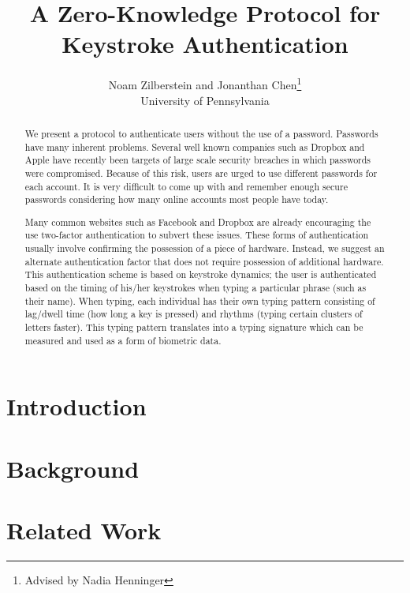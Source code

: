\documentclass[11pt]{article}
\begin{document}
\nocite{*}

\title{A Zero-Knowledge Protocol for Keystroke Authentication}

\author{Noam Zilberstein and Jonanthan Chen\thanks{Advised by Nadia Henninger} \\
University of Pennsylvania
}

\maketitle

\begin{abstract}
  We present a protocol to authenticate users without the use of a password. Passwords have many inherent problems. Several well known companies such as Dropbox and Apple have recently been targets of large scale security breaches in which passwords were compromised. Because of this risk, users are urged to use different passwords for each account. It is very difficult to come up with and remember enough secure passwords considering how many online accounts most people have today.

Many common websites such as Facebook and Dropbox are already encouraging the use two-factor authentication to subvert these issues. These forms of authentication usually involve confirming the possession of a piece of hardware. Instead, we suggest an alternate authentication factor that does not require possession of additional hardware. This authentication scheme is based on keystroke dynamics; the user is authenticated based on the timing of his/her keystrokes when typing a particular phrase (such as their name). When typing, each individual has their own typing pattern consisting of lag/dwell time (how long a key is pressed) and rhythms (typing certain clusters of letters faster).  This typing pattern translates into a typing signature which can be measured and used as a form of biometric data.
\end{abstract}


\section{Introduction}


\section{Background}

\section{Related Work}
\end{document}

